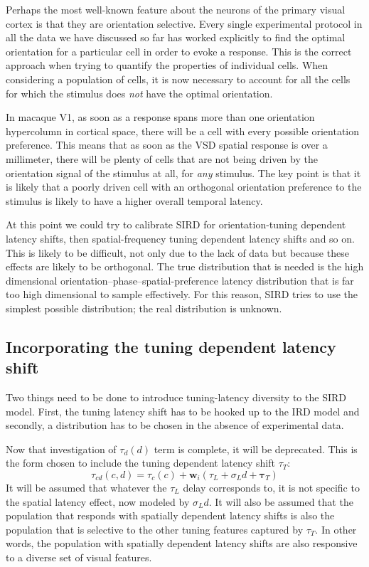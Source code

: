 \documentclass[phd,ianc,twoside]{infthesis}
\begin{document}
Perhaps the most well-known feature about the neurons of the primary
visual cortex is that they are orientation selective. Every single
experimental protocol in all the data we have discussed so far has
worked explicitly to find the optimal orientation for a particular cell
in order to evoke a response. This is the correct approach when trying
to quantify the properties of individual cells. When considering a
population of cells, it is now necessary to account for all the cells
for which the stimulus does \emph{not} have the optimal orientation.

In macaque V1, as soon as a response spans more than one orientation
hypercolumn in cortical space, there will be a cell with every possible
orientation preference. This means that as soon as the VSD spatial
response is over a millimeter, there will be plenty of cells that are
not being driven by the orientation signal of the stimulus at all, for
\emph{any} stimulus. The key point is that it is likely that a poorly
driven cell with an orthogonal orientation preference to the stimulus is
likely to have a higher overall temporal latency.

At this point we could try to calibrate SIRD for orientation-tuning
dependent latency shifts, then spatial-frequency tuning dependent
latency shifts and so on. This is likely to be difficult, not only due
to the lack of data but because these effects are likely to be
orthogonal. The true distribution that is needed is the high dimensional
orientation--phase--spatial-preference latency distribution that is far
too high dimensional to sample effectively. For this reason, SIRD tries
to use the simplest possible distribution; the real distribution is
unknown.

\subsection{Incorporating the tuning dependent latency shift}

Two things need to be done to introduce tuning-latency diversity to the
SIRD model. First, the tuning latency shift has to be hooked up to the
IRD model and secondly, a distribution has to be chosen in the absence
of experimental data.

Now that investigation of $\tau_d(d)$ term is complete, it will be
deprecated. This is the form chosen to include the tuning dependent
latency shift $\tau_T$:
\begin{equation}
\label{eq:IRD_latency_cdt}
\tau_{cd}(c,d) = \tau_c(c) + \pmb{w}_i(\tau_L + \sigma_L d  + \pmb{\tau}_T)
\end{equation}
It will be assumed that whatever the $\tau_L$ delay corresponds to, it
is not specific to the spatial latency effect, now modeled by $\sigma_L
d$. It will also be assumed that the population that responds with
spatially dependent latency shifts is also the population that is
selective to the other tuning features captured by $\tau_T$. In other
words, the population with spatially dependent latency shifts are also
responsive to a diverse set of visual features.
\end{document}
